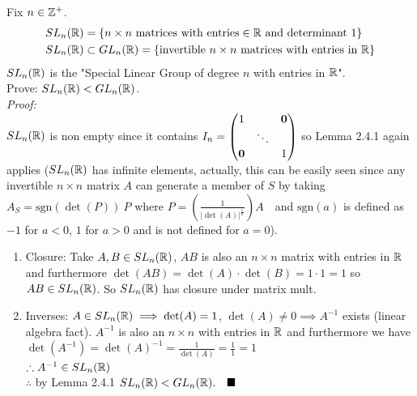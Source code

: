\begin{example}
Fix $n\in {\mathbb{ Z}}^+$.
\begin{align}
    SL_n({\mathbb{ R}})&=\{ n\times n \text{ matrices with entries}\in {\mathbb{ R}} \text{ and determinant }1\} \nonumber \\
    SL_n({\mathbb{ R}})&\subset GL_n({\mathbb{ R}})=\{\text{invertible }n\times n\text{ matrices with entries in } {\mathbb{ R}}\}\nonumber
\end{align}
$SL_n({\mathbb{ R}})$ is the "Special Linear Group of degree $n$ with entries in ${\mathbb{ R}}$".\\
\noindent Prove: $SL_n({\mathbb{ R}})<GL_n({\mathbb{ R}})$.\\
\textit{Proof:}\\
\noindent $SL_n({\mathbb{ R}})$ is non empty since it contains $I_n=\begin{pmatrix}
1 &  &{\mathbf{0}} \\
 & \ddots &  \\
{\mathbf{0}}&&1
\end{pmatrix}$ so Lemma 2.4.1 again applies ($SL_n({\mathbb{ R}})$ has infinite elements, actually, this can be easily seen since any invertible $n\times n$ matrix $A$ can generate a member of $S$ by taking $A_{S}=\text{sgn}(\det(P))\ P$  where  $P=\left(\frac{1}{|\det(A)|^{\frac{1}{n}}}\right) A \ \ \ $ and $\text{sgn}(a)$ is defined as $-1$ for $a<0$, $1$ for $a>0$ and is not defined for $a=0$).\\

\begin{enumerate}
    \item Closure: Take $A,B\in SL_n({\mathbb{ R}})$, $AB$ is also an $n\times n$ matrix with entries in ${\mathbb{ R}}$ and furthermore $\det(AB)=\det(A)\cdot \det(B)=1\cdot 1=1$ so $AB\in SL_n({\mathbb{ R}})$. So $SL_n({\mathbb{ R}})$ has closure under matrix mult.
    \item Inverses: $A\in SL_n({\mathbb{ R}})\implies \det(A)=1$, $\det(A)\neq 0 \implies A^{-1}$ exists (linear algebra fact). $A^{-1}$ is also an $n\times n$ with entries in ${\mathbb{ R}}$ and furthermore we have $\det(A^{-1})=\det(A)^{-1}=\frac{1}{\det(A)}=\frac{1}{1}=1$\\
     $\therefore A^{-1}\in SL_n({\mathbb{ R}})$\\
     \noindent $\therefore$ by Lemma 2.4.1 $SL_n(\R)<GL_n(\R). \ \ \ \blacksquare$
\end{enumerate}
\end{example}

